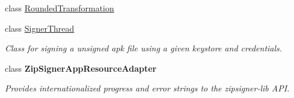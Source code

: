 \begin{DoxyCompactItemize}
class \hyperlink{classorg_1_1buildmlearn_1_1toolkit_1_1utilities_1_1RoundedTransformation}{Rounded\+Transformation}
\item 
class \hyperlink{classorg_1_1buildmlearn_1_1toolkit_1_1utilities_1_1SignerThread}{Signer\+Thread}
\begin{DoxyCompactList}\small\item\em Class for signing a unsigned apk file using a given keystore and credentials. \end{DoxyCompactList}\item 
class {\bfseries Zip\+Signer\+App\+Resource\+Adapter}
\begin{DoxyCompactList}\small\item\em Provides internationalized progress and error strings to the zipsigner-\/lib A\+PI. \end{DoxyCompactList}\end{DoxyCompactItemize}
